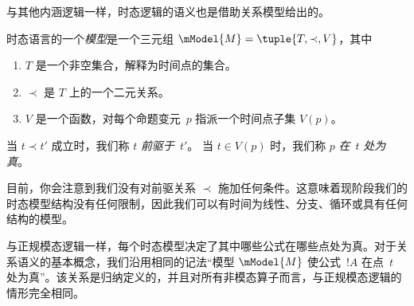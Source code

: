 \documentclass[../../../include/open-logic-section]{subfiles}
\begin{document}
与其他内涵逻辑一样，时态逻辑的语义也是借助关系模型给出的。

\begin{defn}
  时态语言的一个\emph{模型}是一个三元组 $\mModel{M} = \tuple{T, \prec, V}$，其中
  \begin{enumerate}
  \item $T$ 是一个非空集合，解释为时间点的集合。
  \item $\prec$ 是 $T$ 上的一个二元关系。
  \item $V$ 是一个函数，对每个命题变元~$p$ 指派一个时间点子集 $V(p)$。
  \end{enumerate}
  当 $t \prec t'$ 成立时，我们称 $t$ \emph{前驱于}~$t'$。
  当 $t \in V(p)$ 时，我们称 $p$ \emph{在}~$t$ \emph{处为真}。
\end{defn}

目前，你会注意到我们没有对前驱关系 $\prec$ 施加任何条件。这意味着现阶段我们的时态模型结构没有任何限制，因此我们可以有时间为线性、分支、循环或具有任何结构的模型。

与正规模态逻辑一样，每个时态模型决定了其中哪些公式在哪些点处为真。对于关系语义的基本概念，我们沿用相同的记法“模型 $\mModel{M}$ 使公式~$!A$ 在点~$t$ 处为真”。该关系是归纳定义的，并且对所有非模态算子而言，与正规模态逻辑的情形完全相同。
\end{document}
